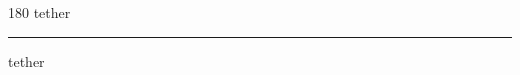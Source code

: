 
\begin{frame}
\begin{center}
\begin{turn}{180}
{\fontsize{2.5cm}{1em}\selectfont tether}
\end{turn}
\vspace{1em}\par  
\hrule
\vspace{1em}\par  
{\fontsize{2.5cm}{1em}\selectfont tether}
\end{center}
\end{frame}
